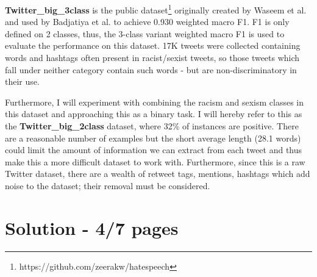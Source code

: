 \documentclass[12pt,a4paper]{article}
\begin{document}
\textbf{Twitter\_big\_3class} is the public dataset\footnote{https://github.com/zeerakw/hatespeech} originally created by Waseem et al. \citeyear{Waseem} and used by Badjatiya et al.\citeyear{Badjatiya} to achieve 0.930 weighted macro F1. F1 is only defined on 2 classes, thus, the 3-class variant weighted macro F1 is used to evaluate the performance on this dataset. 17K tweets were collected containing words and hashtags often present in racist/sexist tweets, so those tweets which fall under neither category contain such words - but are non-discriminatory in their use.

Furthermore, I will experiment with combining the racism and sexism classes in this dataset and approaching this as a binary task. I will hereby refer to this as the \textbf{Twitter\_big\_2class} dataset, where 32\% of instances are positive. There are a reasonable number of examples but the short average length (28.1 words) could limit the amount of information we can extract from each tweet and thus make this a more difficult dataset to work with. Furthermore, since this is a raw Twitter dataset, there are a wealth of retweet tags, mentions, hashtags which add noise to the dataset; their removal must be considered.


\section{Solution - 4/7 pages}
\end{document}

